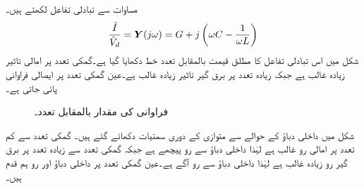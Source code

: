 مساوات  سے تبادلی تفاعل  لکھتے ہیں۔
\begin{align}
\frac{\hat{I}}{\hat{V}_d}={{\boldsymbol{Y}}}(j\omega)=G+j\left(\omega C-\frac{1}{\omega L}\right)
\end{align}
شکل  میں اس تبادلی تفاعل کا مطلق قیمت بالمقابل تعدد خط دکھایا گیا ہے۔گمکی تعدد پر امالی تاثیر زیادہ غالب ہے جبکہ زیادہ تعدد پر برق گیر تاثیر زیادہ غالب ہے۔عین گمکی تعدد پر ایصالی فراوانی پائی جاتی ہے۔
\begin{figure}
\centering
{}
\caption{فراوانی کی مقدار بالمقابل تعدد۔}
\label{شکل_تعددی_فراوانی_بالمقابل_تعدد}
\end{figure}
شکل  میں داخلی دباؤ  کے حوالے سے متوازی  کے دوری سمتیات دکھائے گئے ہیں۔ گمکی تعدد سے کم تعدد پر امالی رو غالب ہے لہٰذا داخلی دباؤ سے رو پیچھے ہے جبکہ گمکی تعدد سے زیادہ تعدد پر برق گیر رو زیادہ غالب ہے لہٰذا داخلی دباؤ سے رو آگے ہے۔عین گمکی تعدد پر داخلی دباؤ اور رو ہم قدم ہیں۔

